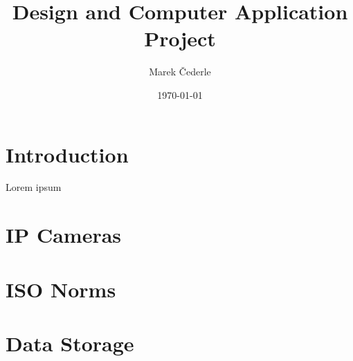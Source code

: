 \documentclass{article}
\title{Design and Computer Application Project}
\author{Marek Čederle		}
\date{\today}
\begin{document}
\maketitle

\tableofcontents

\section{Introduction}
Lorem ipsum

\section{IP Cameras}


\section{ISO Norms}


\section{Data Storage}
\end{document}
